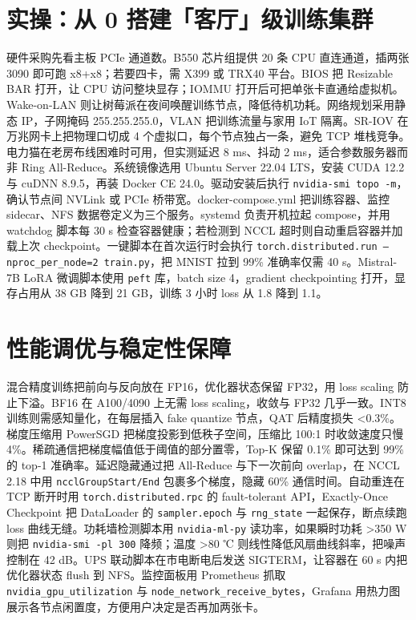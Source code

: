 \chapter{实操：从 0 搭建「客厅」级训练集群}
硬件采购先看主板 PCIe 通道数。B550 芯片组提供 20 条 CPU 直连通道，插两张 3090 即可跑 x8+x8；若要四卡，需 X399 或 TRX40 平台。BIOS 把 Resizable BAR 打开，让 CPU 访问整块显存；IOMMU 打开后可把单张卡直通给虚拟机。Wake-on-LAN 则让树莓派在夜间唤醒训练节点，降低待机功耗。网络规划采用静态 IP，子网掩码 255.255.255.0，VLAN 把训练流量与家用 IoT 隔离。SR-IOV 在万兆网卡上把物理口切成 4 个虚拟口，每个节点独占一条，避免 TCP 堆栈竞争。电力猫在老房布线困难时可用，但实测延迟 8 ms、抖动 2 ms，适合参数服务器而非 Ring All-Reduce。系统镜像选用 Ubuntu Server 22.04 LTS，安装 CUDA 12.2 与 cuDNN 8.9.5，再装 Docker CE 24.0。驱动安装后执行 \texttt{nvidia-smi topo -m}，确认节点间 NVLink 或 PCIe 桥带宽。docker-compose.yml 把训练容器、监控 sidecar、NFS 数据卷定义为三个服务。systemd 负责开机拉起 compose，并用 watchdog 脚本每 30 s 检查容器健康；若检测到 NCCL 超时则自动重启容器并加载上次 checkpoint。一键脚本在首次运行时会执行 \texttt{torch.distributed.run --nproc\_{}per\_{}node=2 train.py}，把 MNIST 拉到 99\%{} 准确率仅需 40 s。Mistral-7B LoRA 微调脚本使用 \texttt{peft} 库，batch size 4，gradient checkpointing 打开，显存占用从 38 GB 降到 21 GB，训练 3 小时 loss 从 1.8 降到 1.1。\par
\chapter{性能调优与稳定性保障}
混合精度训练把前向与反向放在 FP16，优化器状态保留 FP32，用 loss scaling 防止下溢。BF16 在 A100/4090 上无需 loss scaling，收敛与 FP32 几乎一致。INT8 训练则需感知量化，在每层插入 fake quantize 节点，QAT 后精度损失 <0.3\%{}。梯度压缩用 PowerSGD 把梯度投影到低秩子空间，压缩比 100:1 时收敛速度只慢 4\%{}。稀疏通信把梯度幅值低于阈值的部分置零，Top-K 保留 0.1\%{} 即可达到 99\%{} 的 top-1 准确率。延迟隐藏通过把 All-Reduce 与下一次前向 overlap，在 NCCL 2.18 中用 \texttt{ncclGroupStart/End} 包裹多个梯度，隐藏 60\%{} 通信时间。自动重连在 TCP 断开时用 \texttt{torch.distributed.rpc} 的 fault-tolerant API，Exactly-Once Checkpoint 把 DataLoader 的 \texttt{sampler.epoch} 与 \texttt{rng\_{}state} 一起保存，断点续跑 loss 曲线无缝。功耗墙检测脚本用 \texttt{nvidia-ml-py} 读功率，如果瞬时功耗 >350 W 则把 \texttt{nvidia-smi -pl 300} 降频；温度 >80 ℃ 则线性降低风扇曲线斜率，把噪声控制在 42 dB。UPS 联动脚本在市电断电后发送 SIGTERM，让容器在 60 s 内把优化器状态 flush 到 NFS。监控面板用 Prometheus 抓取 \texttt{nvidia\_{}gpu\_{}utilization} 与 \texttt{node\_{}network\_{}receive\_{}bytes}，Grafana 用热力图展示各节点闲置度，方便用户决定是否再加两张卡。\par
